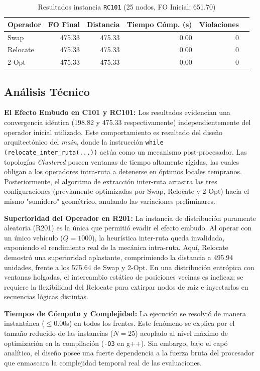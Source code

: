\documentclass[letter, 10pt]{article}
\begin{document}
\begin{table}[h!]
\centering
\caption{Resultados instancia \texttt{RC101} (25 nodos, FO Inicial: 651.70)}
\label{tab:RC101}
\begin{tabular}{lrrrrc}
\toprule
\textbf{Operador} & \textbf{FO Final} & \textbf{Distancia} & \textbf{Tiempo C\'omp. (s)} & \textbf{Violaciones} \\
\midrule
Swap & 475.33 & 475.33 & 0.00 & 0 \\
Relocate & 475.33 & 475.33 & 0.00 & 0 \\
2-Opt & 475.33 & 475.33 & 0.00 & 0 \\
\bottomrule
\end{tabular}
\end{table}

\subsection{An\'alisis T\'ecnico}

\textbf{El Efecto Embudo en C101 y RC101:} Los resultados evidencian una convergencia id\'entica (198.82 y 475.33 respectivamente) independientemente del operador inicial utilizado. Este comportamiento es resultado del dise\~no arquitect\'onico del \textit{main}, donde la instrucci\'on \texttt{while (relocate\_inter\_ruta(...))} act\'ua como un mecanismo post-procesador. Las topolog\'ias \textit{Clustered} poseen ventanas de tiempo altamente r\'igidas, las cuales obligan a los operadores intra-ruta a detenerse en \'optimos locales tempranos. Posteriormente, el algoritmo de extracci\'on inter-ruta arrastra las tres configuraciones (previamente optimizadas por Swap, Relocate y 2-Opt) hacia el mismo "sumidero" geom\'etrico, anulando las variaciones preliminares.

\textbf{Superioridad del Operador en R201:} La instancia de distribuci\'on puramente aleatoria (R201) es la \'unica que permiti\'o evadir el efecto embudo. Al operar con un \'unico veh\'iculo ($Q=1000$), la heur\'istica inter-ruta queda invalidada, exponiendo el rendimiento real de la mec\'anica intra-ruta. Aqu\'i, Relocate demostr\'o una superioridad aplastante, comprimiendo la distancia a 495.94 unidades, frente a los 575.64 de Swap y 2-Opt. En una distribuci\'on entr\'opica con ventanas holgadas, el intercambio est\'atico de posiciones vecinas es ineficaz; se requiere la flexibilidad del Relocate para extirpar nodos de ra\'iz e inyectarlos en secuencias l\'ogicas distintas.

\textbf{Tiempos de C\'omputo y Complejidad:} La ejecuci\'on se resolvi\'o de manera instant\'anea ($\leq 0.00$s) en todos los frentes. Este fen\'omeno se explica por el tama\~no reducido de las instancias ($N=25$) acoplado al nivel m\'aximo de optimizaci\'on en la compilaci\'on (\texttt{-O3} en g++). Sin embargo, bajo el cap\'o anal\'itico, el dise\~no posee una fuerte dependencia a la fuerza bruta del procesador que enmascara la complejidad temporal real de las evaluaciones.
\end{document}
